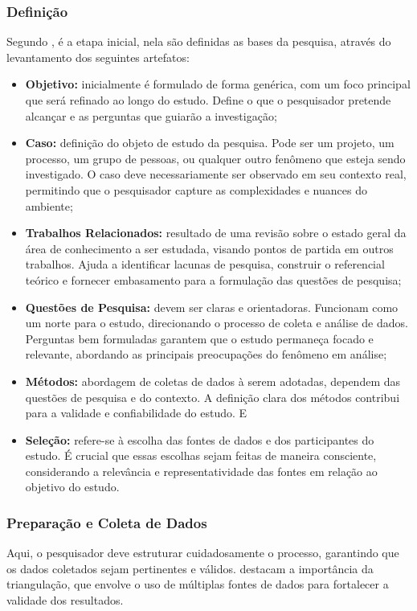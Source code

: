 \subsubsection{Definição}

Segundo , é a etapa inicial, nela são definidas as bases da pesquisa, através do levantamento dos seguintes artefatos:

\begin{itemize}
    \item \textbf{Objetivo:} inicialmente é formulado de forma genérica, com um foco principal que será refinado ao longo do estudo. Define o que o pesquisador pretende alcançar e as perguntas que guiarão a investigação;
    \item \textbf{Caso:} definição do objeto de estudo da pesquisa. Pode ser um projeto, um processo, um grupo de pessoas, ou qualquer outro fenômeno que esteja sendo investigado. O caso deve necessariamente ser observado em seu contexto real, permitindo que o pesquisador capture as complexidades e nuances do ambiente;
    \item \textbf{Trabalhos Relacionados:} resultado de uma revisão sobre o estado geral da área de conhecimento a ser estudada, visando pontos de partida em outros trabalhos. Ajuda a identificar lacunas de pesquisa, construir o referencial teórico e fornecer embasamento para a formulação das questões de pesquisa;
    \item \textbf{Questões de Pesquisa:} devem ser claras e orientadoras. Funcionam como um norte para o estudo, direcionando o processo de coleta e análise de dados. Perguntas bem formuladas garantem que o estudo permaneça focado e relevante, abordando as principais preocupações do fenômeno em análise;
    \item \textbf{Métodos:} abordagem de coletas de dados à serem adotadas, dependem das questões de pesquisa e do contexto. A definição clara dos métodos contribui para a validade e confiabilidade do estudo. E
    \item \textbf{Seleção:} refere-se à escolha das fontes de dados e dos participantes do estudo. É crucial que essas escolhas sejam feitas de maneira consciente, considerando a relevância e representatividade das fontes em relação ao objetivo do estudo.
\end{itemize}

\subsubsection{Preparação e Coleta de Dados}
Aqui, o pesquisador deve estruturar cuidadosamente o processo, garantindo que os dados coletados sejam pertinentes e válidos.  destacam a importância da triangulação, que envolve o uso de múltiplas fontes de dados para fortalecer a validade dos resultados. 

